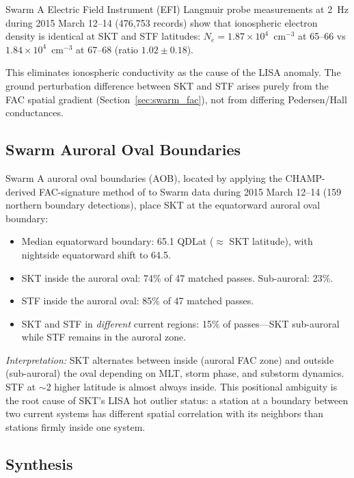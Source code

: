 \documentclass[11pt,letterpaper]{article}
\begin{document}
Swarm A Electric Field Instrument (EFI) Langmuir probe measurements
\citep{knudsen2017thermal} at 2~Hz during 2015 March 12--14 (476,753 records)
show that ionospheric electron density is identical at SKT and STF latitudes:
$N_e = 1.87 \times 10^4$~cm$^{-3}$ at 65--66\textdegree{}{} vs
$1.84 \times 10^4$~cm$^{-3}$ at 67--68\textdegree{}{} (ratio $1.02 \pm 0.18$).

This eliminates ionospheric conductivity as the cause of the LISA anomaly.
The ground perturbation difference between SKT and STF arises purely from the
FAC spatial gradient (Section~\ref{sec:swarm_fac}), not from differing
Pedersen/Hall conductances.

\subsection{Swarm Auroral Oval Boundaries}
\label{sec:aob}

Swarm A auroral oval boundaries (AOB), located by applying the CHAMP-derived
FAC-signature method of \citet{xiong2014aob} to Swarm data during
2015 March 12--14 (159 northern boundary detections), place SKT at the
equatorward auroral oval boundary:
\begin{itemize}
\item Median equatorward boundary: 65.1\textdegree{}{} QDLat ($\approx$ SKT
  latitude), with nightside equatorward shift to 64.5\textdegree{}.
\item SKT inside the auroral oval: 74\% of 47 matched passes. Sub-auroral: 23\%.
\item STF inside the auroral oval: 85\% of 47 matched passes.
\item SKT and STF in \textit{different} current regions: 15\% of passes---SKT
  sub-auroral while STF remains in the auroral zone.
\end{itemize}

\textit{Interpretation:} SKT alternates between inside (auroral FAC zone) and
outside (sub-auroral) the oval depending on MLT, storm phase, and substorm
dynamics. STF at $\sim$2\textdegree{}{} higher latitude is almost always inside.
This positional ambiguity is the root cause of SKT's LISA hot outlier status: a
station at a boundary between two current systems has different spatial
correlation with its neighbors than stations firmly inside one system.

\subsection{Synthesis}
\end{document}
